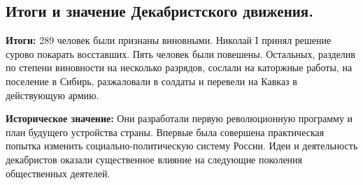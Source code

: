 \subsection{Итоги и значение Декабристского движения.}

\textbf{Итоги:} 289 человек были признаны виновными. Николай I принял решение сурово покарать восставших. Пять человек были повешены. Остальных, разделив по степени виновности на несколько разрядов, сослали на каторжные работы, на поселение в Сибирь, разжаловали в солдаты и перевели на Кавказ в действующую армию.

\textbf{Историческое значение:} Они разработали первую революционную программу и план будущего устройства страны. Впервые была совершена практическая попытка изменить социально-политическую систему России. Идеи и деятельность декабристов оказали существенное влияние на следующие поколения общественных деятелей.
